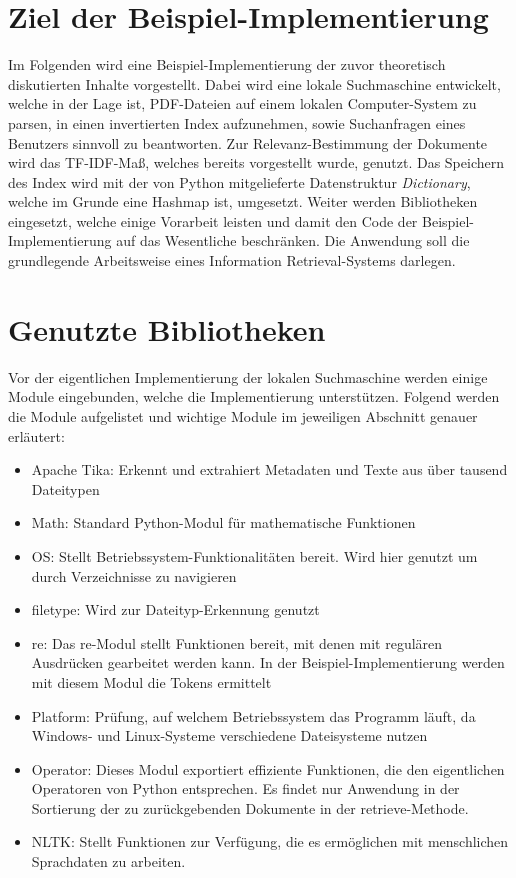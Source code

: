 \section{Ziel der Beispiel-Implementierung}\label{ziel-der-beispiel-implementierung}

Im Folgenden wird eine Beispiel-Implementierung der zuvor theoretisch diskutierten Inhalte vorgestellt. Dabei wird eine lokale Suchmaschine entwickelt, welche in der Lage ist, PDF-Dateien auf einem lokalen Computer-System zu parsen, in einen invertierten Index aufzunehmen, sowie Suchanfragen eines Benutzers sinnvoll zu beantworten. Zur Relevanz-Bestimmung der Dokumente wird das TF-IDF-Maß, welches bereits vorgestellt wurde, genutzt. Das Speichern des Index wird mit der von Python mitgelieferte Datenstruktur \textit{Dictionary}, welche im Grunde eine Hashmap ist, umgesetzt. Weiter werden Bibliotheken eingesetzt, welche einige Vorarbeit leisten und damit den Code der Beispiel-Implementierung auf das Wesentliche beschränken. Die Anwendung soll die grundlegende Arbeitsweise eines Information Retrieval-Systems darlegen.

\section{Genutzte Bibliotheken}\label{genutzte-bibliotheken}

Vor der eigentlichen Implementierung der lokalen Suchmaschine werden einige Module eingebunden, welche die Implementierung unterstützen. Folgend werden die Module aufgelistet und wichtige Module im jeweiligen Abschnitt genauer erläutert:\newpage
\begin{itemize}
	\item Apache Tika: Erkennt und extrahiert Metadaten und Texte aus über tausend Dateitypen
	\item Math: Standard Python-Modul für mathematische Funktionen
	\item OS: Stellt Betriebssystem-Funktionalitäten bereit. Wird hier genutzt um durch Verzeichnisse zu navigieren
	\item filetype: Wird zur Dateityp-Erkennung genutzt
	\item re: Das re-Modul stellt Funktionen bereit, mit denen mit regulären Ausdrücken gearbeitet werden kann. In der Beispiel-Implementierung werden mit diesem Modul die Tokens ermittelt
	\item Platform: Prüfung, auf welchem Betriebssystem das Programm läuft, da Windows- und Linux-Systeme verschiedene Dateisysteme nutzen
	\item Operator: Dieses Modul exportiert effiziente Funktionen, die den eigentlichen Operatoren von Python entsprechen. Es findet nur Anwendung in der Sortierung der zu zurückgebenden Dokumente in der retrieve-Methode.
	\item NLTK: Stellt Funktionen zur Verfügung, die es ermöglichen mit menschlichen Sprachdaten zu arbeiten.
\end{itemize}

